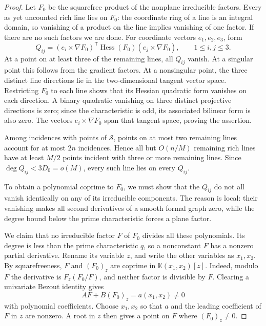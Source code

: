 \begin{proof}
Let $F_0$ be the squarefree product of the nonplane irreducible factors.
Every as yet uncounted rich line lies on $F_0$: the coordinate ring of
a line is an integral domain, so vanishing of a product on the line
implies vanishing of one factor. If there are no such factors we are
done. For coordinate vectors $e_1,e_2,e_3$, form
\begin{equation}\label{geom:flatness-polynomials}
 Q_{ij}=(e_i\times\nabla F_0)^{\mathsf T}
       \operatorname{Hess}(F_0)(e_j\times\nabla F_0),
 \qquad 1\leq i,j\leq3.
\end{equation}
At a point on at least three of the remaining lines, all $Q_{ij}$
vanish. At a singular point this follows from the gradient factors.
At a nonsingular point, the three distinct line directions lie in the
two-dimensional tangent vector space. Restricting $F_0$ to each line
shows that its Hessian quadratic form vanishes on each direction. A
binary quadratic vanishing on three distinct projective directions is
zero; since the characteristic is odd, its associated bilinear form
is also zero. The vectors $e_i\times\nabla F_0$ span that tangent
space, proving the assertion.

Among incidences with points of $\mathcal S$, points on at most two
remaining lines account for at most $2n$ incidences. Hence all but
$O(n/M)$ remaining rich lines have at least $M/2$ points incident
with three or more remaining lines. Since
$\deg Q_{ij}<3D_0=o(M)$, every such line lies on every $Q_{ij}$.

To obtain a polynomial coprime to $F_0$, we must show that the
$Q_{ij}$ do not all vanish identically on any of its irreducible
components. The reason is local: their vanishing makes all second
derivatives of a smooth formal graph zero, while the degree bound
below the prime characteristic forces a plane factor.

We claim that no irreducible factor $F$ of $F_0$ divides all these
polynomials. Its degree is less than the prime characteristic $q$,
so a nonconstant $F$ has a nonzero partial derivative. Rename its
variable $z$, and write the other variables as $x_1,x_2$. By
squarefreeness, $F$ and $(F_0)_z$ are coprime in
$\mathbb K(x_1,x_2)[z]$. Indeed, modulo $F$ the derivative is
$F_z(F_0/F)$, and neither factor is divisible by $F$. Clearing a
univariate Bezout identity gives
\[
 A F+B(F_0)_z=a(x_1,x_2)\ne0
\]
with polynomial coefficients. Choose $x_1,x_2$ so that $a$ and
the leading coefficient of $F$ in $z$ are nonzero. A root in $z$
then gives a point on $F$ where $(F_0)_z\ne0$.


\end{proof}
